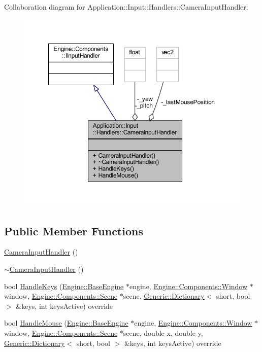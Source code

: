 Collaboration diagram for Application\+:\+:Input\+:\+:Handlers\+:\+:Camera\+Input\+Handler\+:
\nopagebreak
\begin{figure}[H]
\begin{center}
\leavevmode
\includegraphics[width=350pt]{classApplication_1_1Input_1_1Handlers_1_1CameraInputHandler__coll__graph}
\end{center}
\end{figure}
\subsection*{Public Member Functions}
\begin{DoxyCompactItemize}
\item 
\mbox{\hyperlink{classApplication_1_1Input_1_1Handlers_1_1CameraInputHandler_a1863bafdf1002ddebe45795112c4c324}{Camera\+Input\+Handler}} ()
\item 
\mbox{\hyperlink{classApplication_1_1Input_1_1Handlers_1_1CameraInputHandler_a08ccb4be5e9da5e461b3b1905a8da90d}{$\sim$\+Camera\+Input\+Handler}} ()
\item 
bool \mbox{\hyperlink{classApplication_1_1Input_1_1Handlers_1_1CameraInputHandler_a149884ea2dc9deea39d3dcd10dfa74b1}{Handle\+Keys}} (\mbox{\hyperlink{classEngine_1_1BaseEngine}{Engine\+::\+Base\+Engine}} $\ast$engine, \mbox{\hyperlink{classEngine_1_1Components_1_1Window}{Engine\+::\+Components\+::\+Window}} $\ast$window, \mbox{\hyperlink{classEngine_1_1Components_1_1Scene}{Engine\+::\+Components\+::\+Scene}} $\ast$scene, \mbox{\hyperlink{classGeneric_1_1Dictionary}{Generic\+::\+Dictionary}}$<$ short, bool $>$ \&keys, int keys\+Active) override
\item 
bool \mbox{\hyperlink{classApplication_1_1Input_1_1Handlers_1_1CameraInputHandler_ab06fa94ce5265dc06abb645ea29850bd}{Handle\+Mouse}} (\mbox{\hyperlink{classEngine_1_1BaseEngine}{Engine\+::\+Base\+Engine}} $\ast$engine, \mbox{\hyperlink{classEngine_1_1Components_1_1Window}{Engine\+::\+Components\+::\+Window}} $\ast$window, \mbox{\hyperlink{classEngine_1_1Components_1_1Scene}{Engine\+::\+Components\+::\+Scene}} $\ast$scene, double x, double y, \mbox{\hyperlink{classGeneric_1_1Dictionary}{Generic\+::\+Dictionary}}$<$ short, bool $>$ \&keys, int keys\+Active) override
\end{DoxyCompactItemize}
